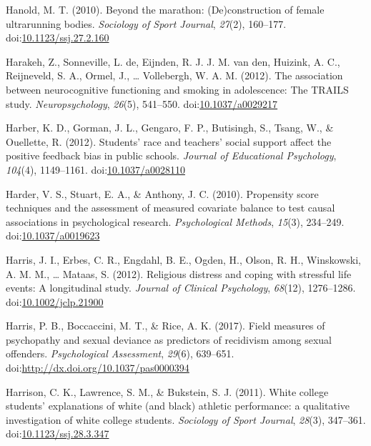 \documentclass[english,man]{apa6}
\begin{document}
\hypertarget{ref-Hanold2010}{}
Hanold, M. T. (2010). Beyond the marathon: (De)construction of female
ultrarunning bodies. \emph{Sociology of Sport Journal}, \emph{27}(2),
160--177.
doi:\href{https://doi.org/10.1123/ssj.27.2.160}{10.1123/ssj.27.2.160}

\hypertarget{ref-Harakeh2012}{}
Harakeh, Z., Sonneville, L. de, Eijnden, R. J. J. M. van den, Huizink,
A. C., Reijneveld, S. A., Ormel, J., \ldots{} Vollebergh, W. A. M.
(2012). The association between neurocognitive functioning and smoking
in adolescence: The TRAILS study. \emph{Neuropsychology}, \emph{26}(5),
541--550. doi:\href{https://doi.org/10.1037/a0029217}{10.1037/a0029217}

\hypertarget{ref-Harber2012}{}
Harber, K. D., Gorman, J. L., Gengaro, F. P., Butisingh, S., Tsang, W.,
\& Ouellette, R. (2012). Students' race and teachers' social support
affect the positive feedback bias in public schools. \emph{Journal of
Educational Psychology}, \emph{104}(4), 1149--1161.
doi:\href{https://doi.org/10.1037/a0028110}{10.1037/a0028110}

\hypertarget{ref-Harder2010}{}
Harder, V. S., Stuart, E. A., \& Anthony, J. C. (2010). Propensity score
techniques and the assessment of measured covariate balance to test
causal associations in psychological research. \emph{Psychological
Methods}, \emph{15}(3), 234--249.
doi:\href{https://doi.org/10.1037/a0019623}{10.1037/a0019623}

\hypertarget{ref-Harris2012}{}
Harris, J. I., Erbes, C. R., Engdahl, B. E., Ogden, H., Olson, R. H.,
Winskowski, A. M. M., \ldots{} Mataas, S. (2012). Religious distress and
coping with stressful life events: A longitudinal study. \emph{Journal
of Clinical Psychology}, \emph{68}(12), 1276--1286.
doi:\href{https://doi.org/10.1002/jclp.21900}{10.1002/jclp.21900}

\hypertarget{ref-Harris2017}{}
Harris, P. B., Boccaccini, M. T., \& Rice, A. K. (2017). Field measures
of psychopathy and sexual deviance as predictors of recidivism among
sexual offenders. \emph{Psychological Assessment}, \emph{29}(6),
639--651.
doi:\href{https://doi.org/http://dx.doi.org/10.1037/pas0000394}{http://dx.doi.org/10.1037/pas0000394}

\hypertarget{ref-Harrison2011}{}
Harrison, C. K., Lawrence, S. M., \& Bukstein, S. J. (2011). White
college students' explanations of white (and black) athletic
performance: a qualitative investigation of white college students.
\emph{Sociology of Sport Journal}, \emph{28}(3), 347--361.
doi:\href{https://doi.org/10.1123/ssj.28.3.347}{10.1123/ssj.28.3.347}
\end{document}
